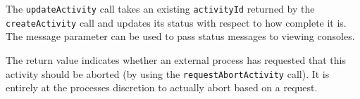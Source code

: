 The \verb+updateActivity+ call takes an existing \verb+activityId+ returned by
the \verb+createActivity+ call and updates its status with respect to how complete it is.
The message parameter can be used to pass status messages to viewing consoles.

The return value indicates whether an external process has requested that this activity
should be aborted (by using the \verb+requestAbortActivity+ call). It is entirely at the processes
discretion to actually abort based on a request.
